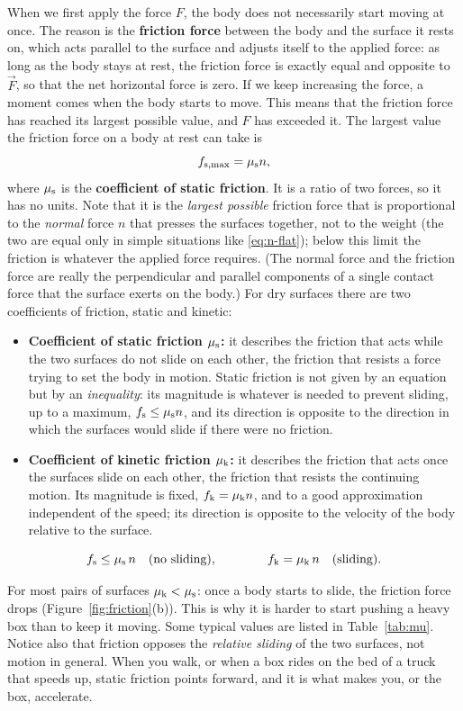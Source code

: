 \documentclass[11pt,a4paper]{article}
\begin{document}
When we first apply the force $F$, the body does not necessarily start moving at once. The reason is
the \textbf{friction force} between the body and the surface it rests on, which acts parallel to the
surface and adjusts itself to the applied force: as long as the body stays at rest, the friction
force is exactly equal and opposite to $\vec{F}$, so that the net horizontal force is zero. If we keep
increasing the force, a moment comes when the body starts to move. This means that the friction force
has reached its largest possible value, and $F$ has exceeded it. The largest value the friction force
on a body at rest can take is
\begin{equation}\label{eq:fmax}
  f_{\mathrm{s,max}} = \mu_{\mathrm{s}} n ,
\end{equation}
where $\mu_{\mathrm{s}}$ is the \textbf{coefficient of static friction}. It is a ratio of two forces, so it
has no units. Note that it is the \emph{largest possible} friction force that is proportional to the
\emph{normal} force $n$ that presses the surfaces together, not to the weight (the two are equal only
in simple situations like \eqref{eq:n-flat}); below this limit the friction is whatever the applied
force requires. (The normal force and the friction force are really the perpendicular and parallel
components of a single contact force that the surface exerts on the body.) For dry surfaces there are
two coefficients of friction, static and kinetic:
\begin{itemize}
  \item \textbf{Coefficient of static friction $\mu_{\mathrm{s}}$:} it describes the friction that acts
    while the two surfaces do not slide on each other, the friction that resists a force trying to set
    the body in motion. Static friction is not given by an equation but by an \emph{inequality}: its
    magnitude is whatever is needed to prevent sliding, up to a maximum, $f_{\mathrm{s}} \leq \mu_{\mathrm{s}} n$,
    and its direction is opposite to the direction in which the surfaces would slide if there were no
    friction.
  \item \textbf{Coefficient of kinetic friction $\mu_{\mathrm{k}}$:} it describes the friction that acts once
    the surfaces slide on each other, the friction that resists the continuing motion. Its magnitude
    is fixed, $f_{\mathrm{k}} = \mu_{\mathrm{k}} n$, and to a good approximation independent of the speed; its
    direction is opposite to the velocity of the body relative to the surface.
\end{itemize}
\begin{keyresult}
\[
  f_{\mathrm{s}} \leq \mu_{\mathrm{s}}\, n \quad \text{(no sliding)}, \qquad\qquad
  f_{\mathrm{k}} = \mu_{\mathrm{k}}\, n \quad \text{(sliding)}.
\]
\end{keyresult}
For most pairs of surfaces $\mu_{\mathrm{k}} < \mu_{\mathrm{s}}$: once a body starts to slide, the friction
force drops (Figure~\ref{fig:friction}(b)). This is why it is harder to start pushing a heavy box
than to keep it moving. Some typical values are listed in Table~\ref{tab:mu}. Notice also that
friction opposes the \emph{relative sliding} of the two surfaces, not motion in general. When you
walk, or when a box rides on the bed of a truck that speeds up, static friction points forward, and
it is what makes you, or the box, accelerate.
\end{document}

